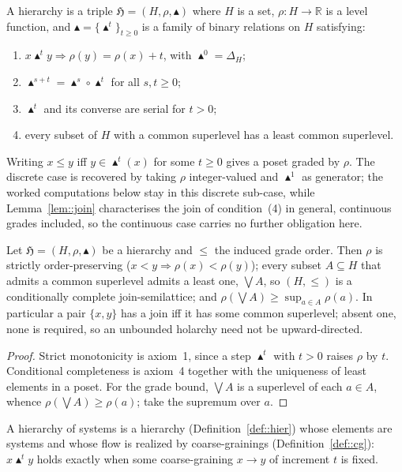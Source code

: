 \documentclass[runningheads]{llncs}
\newcommand{\R}{\mathbb{R}}
\begin{document}
\begin{definition}[Hierarchy]\label{def::hier}
A hierarchy is a triple $\mathfrak H=(H,\rho,\blacktriangle)$ where $H$ is a set, $\rho:H\to\R$ is a level function, and $\blacktriangle=\{\blacktriangle^t\}_{t\geq 0}$ is a family of binary relations on $H$ satisfying:
\begin{enumerate}
\item $x\blacktriangle^t y\Rightarrow \rho(y)=\rho(x)+t$, with $\blacktriangle^0=\Delta_H$;
\item $\blacktriangle^{s+t}=\blacktriangle^s\circ\blacktriangle^t$ for all $s,t\geq 0$;
\item $\blacktriangle^t$ and its converse are serial for $t>0$;
\item every subset of $H$ with a common superlevel has a least common superlevel.
\end{enumerate}
Writing $x\leq y$ iff $y\in\blacktriangle^t(x)$ for some $t\geq0$ gives a poset graded by $\rho$. The discrete case is recovered by taking $\rho$ integer-valued and $\blacktriangle^1$ as generator; the worked computations below stay in this discrete sub-case, while Lemma~\ref{lem::join} characterises the join of condition~(4) in general, continuous grades included, so the continuous case carries no further obligation here.
\end{definition}

\begin{lemma}\label{lem::join}
Let $\mathfrak H=(H,\rho,\blacktriangle)$ be a hierarchy and $\le$ the induced grade order. Then $\rho$ is strictly order-preserving ($x<y\Rightarrow\rho(x)<\rho(y)$); every subset $A\subseteq H$ that admits a common superlevel admits a least one, $\bigvee A$, so $(H,\le)$ is a conditionally complete join-semilattice; and $\rho(\bigvee A)\ge\sup_{a\in A}\rho(a)$. In particular a pair $\{x,y\}$ has a join iff it has some common superlevel; absent one, none is required, so an unbounded holarchy need not be upward-directed.
\end{lemma}
\begin{proof}
Strict monotonicity is axiom~1, since a step $\blacktriangle^t$ with $t>0$ raises $\rho$ by $t$. Conditional completeness is axiom~4 together with the uniqueness of least elements in a poset. For the grade bound, $\bigvee A$ is a superlevel of each $a\in A$, whence $\rho(\bigvee A)\ge\rho(a)$; take the supremum over $a$.
\end{proof}

\begin{definition}\label{def::hsys}
A hierarchy of systems is a hierarchy (Definition~\ref{def::hier}) whose elements are systems and whose flow is realized by coarse-grainings (Definition~\ref{def::cg}): $x\blacktriangle^t y$ holds exactly when some coarse-graining $x\to y$ of increment $t$ is fixed.
\end{definition}
\end{document}
